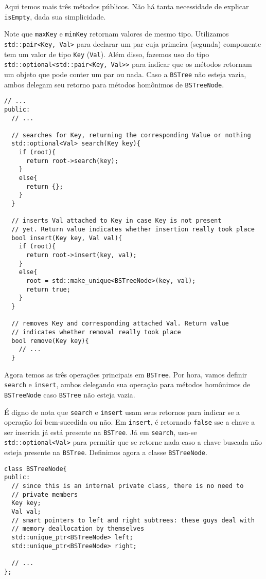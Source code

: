 \documentclass[11pt]{article}
\begin{document}
Aqui temos mais três métodos públicos.  Não há tanta necessidade
de explicar \texttt{isEmpty}, dada sua simplicidade.

Note que \texttt{maxKey} e \texttt{minKey} retornam valores de mesmo
tipo. Utilizamos \texttt{std::pair<Key, Val>} para declarar um par cuja
primeira (segunda) componente tem um valor de tipo \texttt{Key}
(\texttt{Val}). Além disso, fazemos uso do tipo
\texttt{std::optional<std::pair<Key, Val>>} para indicar que os métodos
retornam um objeto que pode conter um par ou nada.  Caso a
\texttt{BSTree} não esteja vazia, ambos delegam seu retorno para métodos
homônimos de \texttt{BSTreeNode}.

\pagebreak

\begin{verbatim}
// ...
public:
  // ...

  // searches for Key, returning the corresponding Value or nothing
  std::optional<Val> search(Key key){
    if (root){
      return root->search(key);
    }
    else{
      return {};
    }
  }

  // inserts Val attached to Key in case Key is not present
  // yet. Return value indicates whether insertion really took place
  bool insert(Key key, Val val){
    if (root){
      return root->insert(key, val);
    }
    else{
      root = std::make_unique<BSTreeNode>(key, val);
      return true;
    }
  }

  // removes Key and corresponding attached Val. Return value
  // indicates whether removal really took place
  bool remove(Key key){
    // ...
  }
\end{verbatim}

Agora temos as três operações principais em \texttt{BSTree}.  Por hora,
vamos definir \texttt{search} e \texttt{insert}, ambos delegando sua operação
para métodos homônimos de \texttt{BSTreeNode} caso \texttt{BSTree} não esteja
vazia.

É digno de nota que \texttt{search} e \texttt{insert} usam seus retornos para
indicar se a operação foi bem-sucedida ou não.  Em \texttt{insert}, é
retornado \texttt{false} sse a chave a ser inserida já está presente na
\texttt{BSTree}.  Já em \texttt{search}, usa-se \texttt{std::optional<Val>} para
permitir que se retorne nada caso a chave buscada não esteja
presente na \texttt{BSTree}. Definimos agora a classe \texttt{BSTreeNode}.

\pagebreak

\begin{verbatim}
class BSTreeNode{
public:
  // since this is an internal private class, there is no need to
  // private members
  Key key;
  Val val;
  // smart pointers to left and right subtrees: these guys deal with
  // memory deallocation by themselves
  std::unique_ptr<BSTreeNode> left;
  std::unique_ptr<BSTreeNode> right;

  // ...
};
\end{verbatim}
\end{document}
